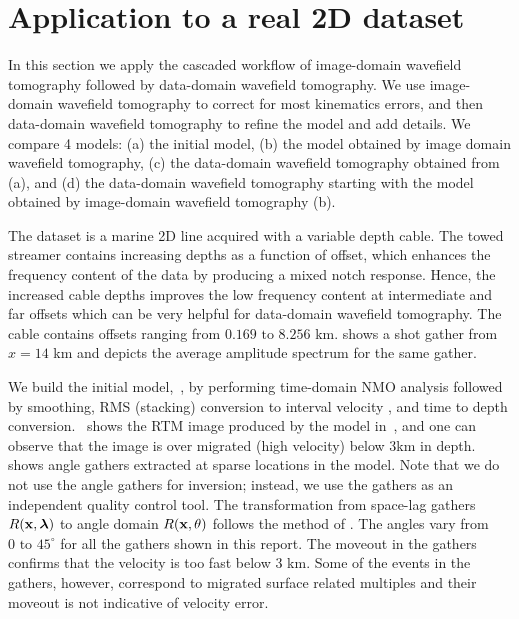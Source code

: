 \section{Application to a real 2D dataset}



In this section we apply the cascaded workflow of image-domain wavefield tomography followed by 
data-domain wavefield tomography.
We use image-domain wavefield tomography to correct for most kinematics errors, and then 
data-domain wavefield tomography to 
refine the model and add details. We compare 4 models: (a) the initial model,
 (b) the model obtained by image domain wavefield tomography, (c) the data-domain wavefield tomography obtained from (a), and 
 (d) the data-domain wavefield tomography starting with the model obtained by image-domain wavefield tomography (b).

The dataset is a marine 2D line acquired with a variable depth cable.
The towed streamer contains increasing depths as a function of offset, which enhances the frequency
content of the data by producing a mixed notch response. Hence,
the increased cable depths improves the low frequency content at intermediate and far offsets which can be very helpful
for data-domain wavefield tomography. The cable contains offsets ranging from $0.169\text{ to }8.256$ km.  shows a shot
gather from $x=14$ km and  depicts the average amplitude spectrum for
the same gather. 

We build the initial model,~, by performing time-domain NMO analysis followed
by smoothing, RMS (stacking) conversion to interval velocity \citep{dix}, and 
time to depth conversion.~ shows the RTM
 image produced by the model in~, and one can observe that the image is over migrated
 (high velocity) below 3km in depth.~ shows angle gathers extracted at
sparse locations in the model. Note that we do not use the angle gathers for inversion; instead,
we use the gathers as an independent quality control tool. The transformation from space-lag
gathers $R({\bf x},{\boldsymbol{\lambda}})$ to angle domain $R({\bf x},\theta)$ follows the method of \cite{sava:1065}.
The angles vary from $0\text{ to }45^\circ$ for all
the gathers shown in this report.
 The moveout in the gathers confirms that the velocity is 
too fast below $3$ km. Some of the events in the gathers, however, correspond to migrated surface related 
multiples and their moveout is not indicative of velocity error.

